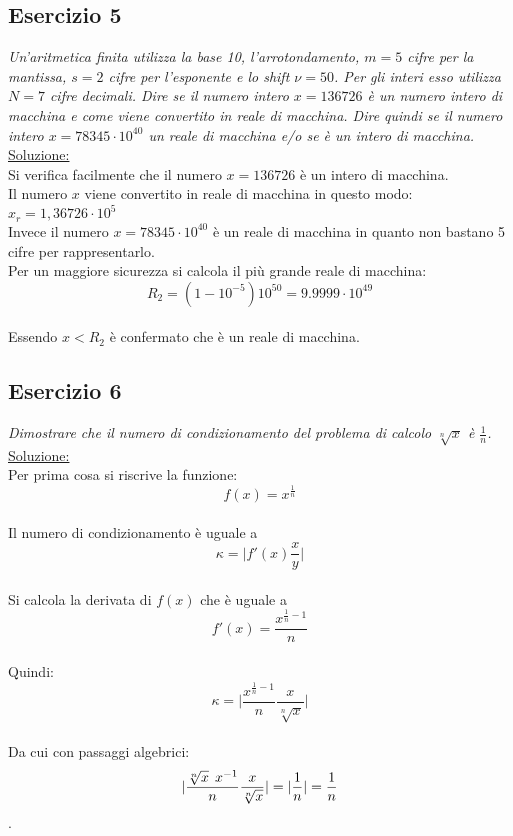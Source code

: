 \subsection{Esercizio 5}
\emph{Un'aritmetica finita utilizza la base 10, l'arrotondamento, $m = 5$ cifre per la mantissa, $s = 2$ cifre per l'esponente e lo shift $\nu = 50$. Per gli interi esso utilizza $N = 7$ cifre decimali. Dire se il numero intero $x = 136726$ è un numero intero di macchina e come viene convertito in reale di macchina. Dire quindi se il numero intero $x = 78345 \cdot 10^{40} $ un reale di macchina e/o se è un intero di macchina.}
\\
\underline{Soluzione:}\\
Si verifica facilmente che il numero $ x = 136726$ è un intero di macchina. \\
Il numero $ x $ viene convertito in reale di macchina in questo modo: $x_{r} = 1,36726 \cdot 10^{5} $\\
Invece il numero $ x = 78345 \cdot 10^{40} $ è un reale di macchina in quanto non bastano 5 cifre per rappresentarlo.\\
Per un maggiore sicurezza si calcola il più grande reale di macchina:\\ $$ R_{2} = (1-10^{-5}) 10^{50} = 9.9999 \cdot 10^{49} $$\\
Essendo $x < R_{2} $ è confermato che è un reale di macchina.


\subsection{Esercizio 6}
\emph{Dimostrare che il numero di condizionamento del problema di calcolo $ \sqrt[n]{x} $ è $\frac{1}{n}$.\\}
\underline{Soluzione:} \\
Per prima cosa si riscrive la funzione:\\ $$f(x) = x^{\frac{1}{n}}$$\\
Il numero di condizionamento è uguale a $$\kappa = \lvert f'(x) \frac{x}{y} \rvert $$\\
Si calcola la derivata di $ f(x) $ che è uguale a \\ $$ f'(x) = \frac{x^ { \frac{1}{n}-1 } }{n}$$\\
Quindi: \\ $$ \kappa = \lvert \frac{x^{\frac{1}{n}-1}}{n} \frac{x}{\sqrt[n]{x} }\rvert$$ \\
Da cui con passaggi algebrici:\\
$$\lvert \frac{\sqrt[n]{x} \hspace{1ex} x^{-1}}{n} \frac{x}{\sqrt[n]{x} } \rvert = \lvert \frac{1}{n} \rvert = \frac{1}{n} $$.

